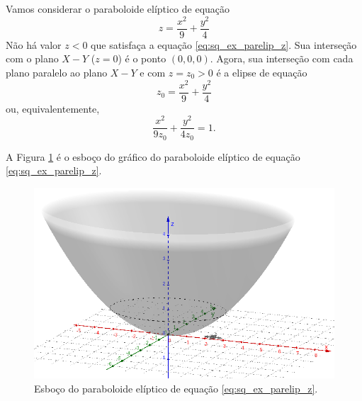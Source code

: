 \begin{ex}
  Vamos considerar o paraboloide elíptico de equação
  \begin{equation}\label{eq:sq_ex_parelip_z}
    z = \frac{x^2}{9}+\frac{y^2}{4}
  \end{equation}
  Não há valor $z<0$ que satisfaça a equação \eqref{eq:sq_ex_parelip_z}. Sua interseção com o plano $X-Y$ ($z=0$) é o ponto $(0, 0, 0)$. Agora, sua interseção com cada plano paralelo ao plano $X-Y$ e com $z=z_0>0$ é a elipse de equação
  \begin{equation}
    z_0 = \frac{x^2}{9}+\frac{y^2}{4}
  \end{equation}
  ou, equivalentemente,
  \begin{equation}
    \frac{x^2}{9z_0}+\frac{y^2}{4z_0}=1.
  \end{equation}

    A Figura \ref{fig:sq_ex_parelip_z} é o esboço do gráfico do paraboloide elíptico de equação \eqref{eq:sq_ex_parelip_z}.

    \begin{figure}[H]
    \centering
    \includegraphics[width=\textwidth]{./cap_superquad/dados/fig_sq_ex_parelip_z/fig}
    \caption{Esboço do paraboloide elíptico de equação \eqref{eq:sq_ex_parelip_z}.}
    \label{fig:sq_ex_parelip_z}
  \end{figure}
\end{ex}

